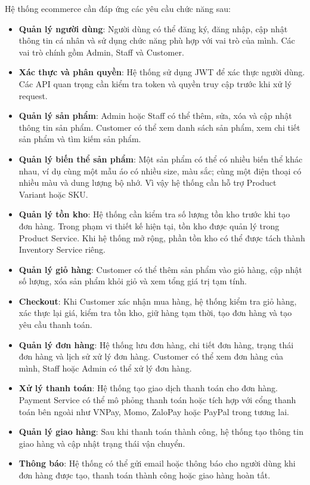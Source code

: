 Hệ thống ecommerce cần đáp ứng các yêu cầu chức năng sau:

\begin{itemize}
  \item \textbf{Quản lý người dùng}: Người dùng có thể đăng ký, đăng nhập, cập nhật thông tin cá nhân và sử dụng chức năng phù hợp với vai trò của mình. Các vai trò chính gồm Admin, Staff và Customer.

  \item \textbf{Xác thực và phân quyền}: Hệ thống sử dụng JWT để xác thực người dùng. Các API quan trọng cần kiểm tra token và quyền truy cập trước khi xử lý request.

  \item \textbf{Quản lý sản phẩm}: Admin hoặc Staff có thể thêm, sửa, xóa và cập nhật thông tin sản phẩm. Customer có thể xem danh sách sản phẩm, xem chi tiết sản phẩm và tìm kiếm sản phẩm.

  \item \textbf{Quản lý biến thể sản phẩm}: Một sản phẩm có thể có nhiều biến thể khác nhau, ví dụ cùng một mẫu áo có nhiều size, màu sắc; cùng một điện thoại có nhiều màu và dung lượng bộ nhớ. Vì vậy hệ thống cần hỗ trợ Product Variant hoặc SKU.

  \item \textbf{Quản lý tồn kho}: Hệ thống cần kiểm tra số lượng tồn kho trước khi tạo đơn hàng. Trong phạm vi thiết kế hiện tại, tồn kho được quản lý trong Product Service. Khi hệ thống mở rộng, phần tồn kho có thể được tách thành Inventory Service riêng.

  \item \textbf{Quản lý giỏ hàng}: Customer có thể thêm sản phẩm vào giỏ hàng, cập nhật số lượng, xóa sản phẩm khỏi giỏ và xem tổng giá trị tạm tính.

  \item \textbf{Checkout}: Khi Customer xác nhận mua hàng, hệ thống kiểm tra giỏ hàng, xác thực lại giá, kiểm tra tồn kho, giữ hàng tạm thời, tạo đơn hàng và tạo yêu cầu thanh toán.

  \item \textbf{Quản lý đơn hàng}: Hệ thống lưu đơn hàng, chi tiết đơn hàng, trạng thái đơn hàng và lịch sử xử lý đơn hàng. Customer có thể xem đơn hàng của mình, Staff hoặc Admin có thể xử lý đơn hàng.

  \item \textbf{Xử lý thanh toán}: Hệ thống tạo giao dịch thanh toán cho đơn hàng. Payment Service có thể mô phỏng thanh toán hoặc tích hợp với cổng thanh toán bên ngoài như VNPay, Momo, ZaloPay hoặc PayPal trong tương lai.

  \item \textbf{Quản lý giao hàng}: Sau khi thanh toán thành công, hệ thống tạo thông tin giao hàng và cập nhật trạng thái vận chuyển.

  \item \textbf{Thông báo}: Hệ thống có thể gửi email hoặc thông báo cho người dùng khi đơn hàng được tạo, thanh toán thành công hoặc giao hàng hoàn tất.
\end{itemize}

